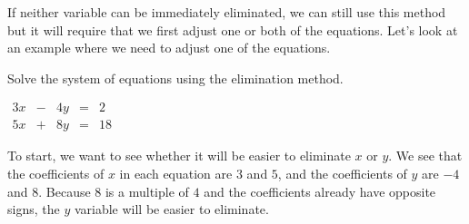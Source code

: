 \documentclass[nooutcomes]{ximera}
\begin{document}
If neither variable can be immediately eliminated,
      we can still use this method but it will require that we first adjust one or both of the equations.
      Let's look at an example where we need to adjust one of the equations.
\begin{example}
Solve the system of equations using the elimination method.
\begin{center}
$
            \begin{array}{ccccc}
            3x& - & 4y & = & 2 \\
            5x& + & 8y & = & 18
            \end{array}
            $
\end{center}
\begin{explanation}
To start, we want to see whether it will be easier to eliminate $x$ or $y$.
          We see that the coefficients of $x$ in each equation are $3$ and $5$,
          and the coefficients of $y$ are $-4$ and $8$.
          Because $8$ is a multiple of $4$ and the coefficients already have opposite signs,
          the $y$ variable will be easier to eliminate.


\end{explanation}
\end{example}
\end{document}
